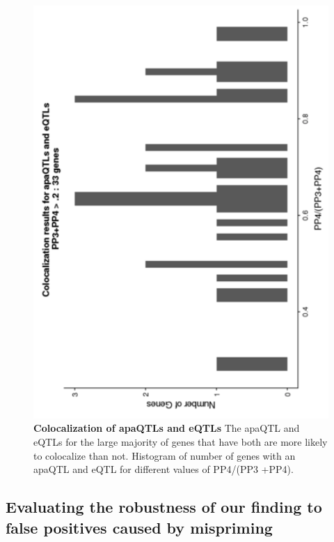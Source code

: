 \begin{figure}
\centering \includegraphics[width=5in]{img/ch02/figureAppendix5.png}
\caption[Colocalization of apaQTLs and eQTLs]{\textbf{Colocalization of apaQTLs and eQTLs} The apaQTL and eQTLs for the large majority of genes that have both are more likely to colocalize than not. Histogram of number of genes with an apaQTL and eQTL for different values of PP4/(PP3 +PP4).}
\label{ffig:Supplementaryfile1-Fig5}
\end{figure} 

\subsection{Evaluating the robustness of our finding to false positives caused by mispriming}\label{ch02-MP-robust}

